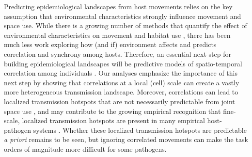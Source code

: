 ﻿\documentclass[11pt]{article}
\begin{document}
Predicting epidemiological landscapes from host movements relies on the key assumption that environmental characteristics strongly influence movement and space use. While there is a growing number of methods that quantify the effect of environmental characteristics on movement and habitat use \citep[reviewed in][]{Hooten2017a}, there has been much less work exploring how (and if) environment affects and predicts correlation and synchrony among hosts.  Therefore, an essential next-step for building epidemiological landscapes will be predictive models of spatio-temporal correlation among individuals \citep[e.g.][]{Brandell2021}.
Our analyses emphasize the importance of this next step by showing that correlations at a local (cell) scale can create a vastly more heterogeneous transmission landscape. Moreover, correlations can lead to localized transmission hotspots that are not necessarily predictable from joint space use \citep{Yang2023a}, and may contribute to the growing empirical recognition that fine-scale, localized transmission hotspots are present in many empirical host-pathogen systems \citep{Albery2021}.  Whether these localized transmission hotspots are predictable \emph{a priori} remains to be seen, but ignoring correlated movements can make the task orders of magnitude more difficult for some pathogens.




\end{document}
